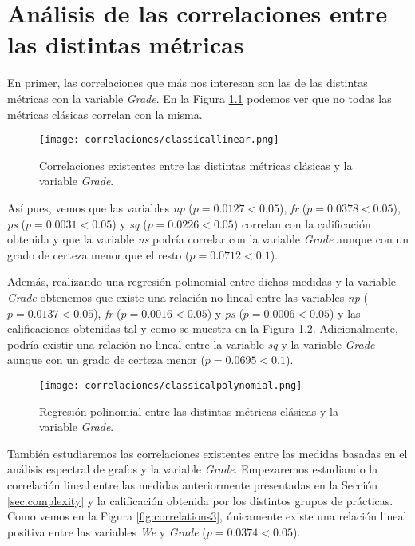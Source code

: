 \chapter{Análisis de las correlaciones entre las distintas métricas}\label{chapter:correlations}

En primer, las correlaciones que más nos interesan son las de las distintas métricas con la variable \emph{Grade}. En la Figura \ref{fig:correlations} podemos ver que no todas las métricas clásicas correlan con la misma.

\begin{figure}[H]
    \centering
    \texttt{[image: correlaciones/classicallinear.png]}
    \caption{Correlaciones existentes entre las distintas métricas clásicas y la variable \emph{Grade}.}
    \label{fig:correlations}
\end{figure}

Así pues, vemos que las variables \emph{np} ($p = 0.0127 < 0.05$), \emph{fr} ($p = 0.0378 < 0.05$), \emph{ps} ($p = 0.0031 < 0.05$) y \emph{sq} ($p = 0.0226 < 0.05$) correlan con la calificación obtenida y que la variable \emph{ns} podría correlar con la variable \emph{Grade} aunque con un grado de certeza menor que el resto ($p = 0.0712 < 0.1$).

Además, realizando una regresión polinomial entre dichas medidas y la variable \emph{Grade} obtenemos que existe una relación no lineal entre las variables \emph{np} ($p = 0.0137 < 0.05$), \emph{fr} ($p = 0.0016 < 0.05$) y \emph{ps} ($p = 0.0006 < 0.05$) y las calificaciones obtenidas tal y como se muestra en la Figura \ref{fig:correlations2}. Adicionalmente, podría existir una relación no lineal entre la variable \emph{sq} y la variable \emph{Grade} aunque con un grado de certeza menor ($p = 0.0695 < 0.1$).

\begin{figure}[H]
    \centering
    \texttt{[image: correlaciones/classicalpolynomial.png]}
    \caption{Regresión polinomial entre las distintas métricas clásicas y la variable \emph{Grade}.}
    \label{fig:correlations2}
\end{figure}

También estudiaremos las correlaciones existentes entre las medidas basadas en el análisis espectral de grafos y la variable \emph{Grade}. Empezaremos estudiando la correlación lineal entre las medidas anteriormente presentadas en la Sección \ref{sec:complexity} y la calificación obtenida por los distintos grupos de prácticas. Como vemos en la Figura \ref{fig:correlations3}, únicamente existe una relación lineal positiva entre las variables \emph{We} y \emph{Grade} ($p = 0.0374 < 0.05$).

